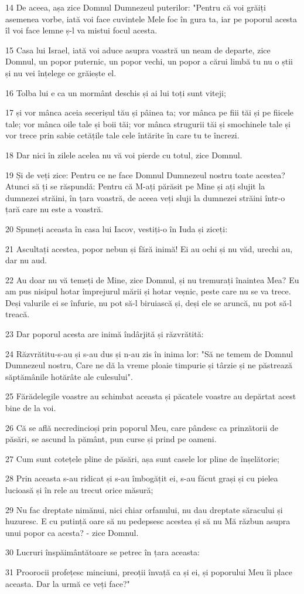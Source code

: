 \par 14 De aceea, așa zice Domnul Dumnezeul puterilor: "Pentru că voi grăiți asemenea vorbe, iată voi face cuvintele Mele foc în gura ta, iar pe poporul acesta îl voi face lemne ș-l va mistui focul acesta.
\par 15 Casa lui Israel, iată voi aduce asupra voastră un neam de departe, zice Domnul, un popor puternic, un popor vechi, un popor a cărui limbă tu nu o știi și nu vei înțelege ce grăiește el.
\par 16 Tolba lui e ca un mormânt deschis și ai lui toți sunt viteji;
\par 17 și vor mânca aceia secerișul tău și pâinea ta; vor mânca pe fiii tăi și pe fiicele tale; vor mânca oile tale și boii tăi; vor mânca strugurii tăi și smochinele tale și vor trece prin sabie cetățile tale cele întărite în care tu te încrezi.
\par 18 Dar nici în zilele acelea nu vă voi pierde cu totul, zice Domnul.
\par 19 Și de veți zice: Pentru ce ne face Domnul Dumnezeul nostru toate acestea? Atunci să ți se răspundă: Pentru că M-ați părăsit pe Mine și ați slujit la dumnezei străini, în țara voastră, de aceea veți sluji la dumnezei străini într-o țară care nu este a voastră.
\par 20 Spuneți aceasta în casa lui Iacov, vestiți-o în Iuda și ziceți:
\par 21 Ascultați acestea, popor nebun și fără inimă! Ei au ochi și nu văd, urechi au, dar nu aud.
\par 22 Au doar nu vă temeți de Mine, zice Domnul, și nu tremurați înaintea Mea? Eu am pus nisipul hotar împrejurul mării și hotar veșnic, peste care nu se va trece. Deși valurile ei se înfurie, nu pot să-l biruiască și, deși ele se aruncă, nu pot să-l treacă.
\par 23 Dar poporul acesta are inimă îndârjită și răzvrătită:
\par 24 Răzvrătitu-s-au și s-au dus și n-au zis în inima lor: "Să ne temem de Domnul Dumnezeul nostru, Care ne dă la vreme ploaie timpurie și târzie și ne păstrează săptămânile hotărâte ale culesului".
\par 25 Fărădelegile voastre au schimbat aceasta și păcatele voastre au depărtat acest bine de la voi.
\par 26 Că se află necredincioși prin poporul Meu, care pândesc ca prinzătorii de păsări, se ascund la pământ, pun curse și prind pe oameni.
\par 27 Cum sunt cotețele pline de păsări, așa sunt casele lor pline de înșelătorie;
\par 28 Prin aceasta s-au ridicat și s-au îmbogățit ei, s-au făcut grași și cu pielea lucioasă și în rele au trecut orice măsură;
\par 29 Nu fac dreptate nimănui, nici chiar orfanului, nu dau dreptate săracului și huzuresc. E cu putință oare să nu pedepsesc acestea și să nu Mă răzbun asupra unui popor ca acesta? - zice Domnul.
\par 30 Lucruri înspăimântătoare se petrec în țara aceasta:
\par 31 Proorocii profețesc minciuni, preoții învață ca și ei, și poporului Meu îi place aceasta. Dar la urmă ce veți face?"


